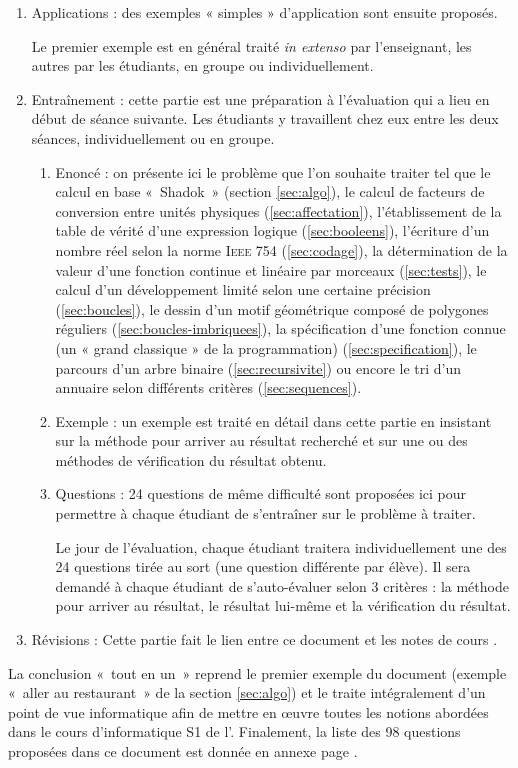 \begin{enumerate}
\item Applications : des exemples « simples » d'application sont ensuite proposés.

	Le premier exemple est en général traité \emph{in extenso} par l'enseignant, les autres
	par les étudiants, en groupe ou individuellement.
	
\item Entraînement : cette partie est une préparation à l'évaluation qui a lieu
	en début de séance suivante. Les étudiants y travaillent chez eux entre les deux séances, 		
	individuellement ou en groupe.
	
	\begin{enumerate}
 	\item Enoncé : on présente ici le problème que l'on souhaite traiter tel que
 			le calcul en base «~Shadok~» (section \ref{sec:algo}),
 			le calcul de facteurs de conversion entre unités physiques (\ref{sec:affectation}),
 			l'établissement de la table de vérité d'une expression logique (\ref{sec:booleens}),
 			l'écriture d'un nombre réel selon la norme \textsc{Ieee} 754 (\ref{sec:codage}),
 			la détermination de la valeur d'une fonction continue et linéaire par morceaux (\ref{sec:tests}),
 			le calcul d'un développement limité selon une certaine précision (\ref{sec:boucles}),
 			le dessin d'un motif géométrique composé de polygones réguliers (\ref{sec:boucles-imbriquees}),
 			la spécification d'une fonction connue (un « grand classique » de la programmation) (\ref{sec:specification}),
 			le parcours d'un arbre binaire  (\ref{sec:recursivite}) ou encore
 			le tri d'un annuaire selon différents critères (\ref{sec:sequences}).
 			
 	\item Exemple : un exemple est traité en détail dans cette partie en insistant
 		sur la méthode pour arriver au résultat recherché et sur une ou des méthodes
 		de vérification du résultat obtenu.
 		
 	\item Questions : 24 questions de même difficulté sont proposées ici pour permettre 
 		à chaque étudiant de s'entraîner sur le problème à traiter.
 		
 		Le jour de l'évaluation, chaque étudiant traitera individuellement une des 24 questions
 		tirée au sort (une question différente par élève). Il sera demandé à chaque étudiant
 		de s'auto-évaluer selon 3 critères : la méthode pour arriver au résultat, 
 		le résultat lui-même et la vérification du résultat.
 		
 	\end{enumerate}
\item Révisions : Cette partie fait le lien entre ce document et les notes de cours
	\cite{cours,td}.
\end{enumerate}

\noindent
La conclusion «~tout en un~» reprend le premier exemple du document 
(exemple «~aller au restaurant~» de la section \ref{sec:algo}) et le traite intégralement 
d'un point de vue informatique afin de mettre en \oe uvre toutes les notions abordées 
dans le cours d'informatique S1 de l'\enib.
Finalement, la liste des 98 questions proposées dans ce document est donnée en annexe page \pageref{annexe:questions}.
